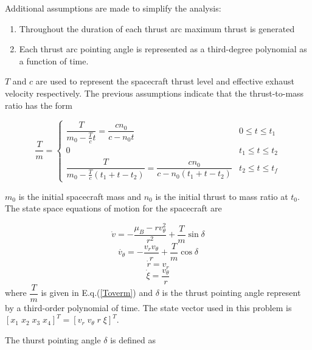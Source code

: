 \noindent Additional assumptions are made to simplify the analysis:

\begin{enumerate}
    \item Throughout the duration of each thrust arc maximum thrust is generated
    \item Each thrust arc pointing angle is represented as a third-degree polynomial as a function of time.
\end{enumerate}

$T$ and $c$ are used to represent the spacecraft thrust level and effective exhaust velocity respectively. The previous assumptions
indicate that the thrust-to-mass ratio has the form

\begin{equation}
\dfrac{T}{m} = \begin{cases} 
    \dfrac{T}{m_0-\frac{T}{c}t} = \dfrac{cn_0}{c-n_0t} & 0\leq t \leq t_1 \\
    0 & t_1\leq t \leq t_2 \\
    \dfrac{T}{m_0-\frac{T}{c}(t_1+t-t_2)} = \dfrac{cn_0}{c-n_0(t_1+t-t_2)} & t_2\leq t \leq t_f 
  \end{cases}
  \label{Toverm}
\end{equation}

\noindent $m_0$ is the initial spacecraft mass and $n_0$ is the initial thrust to mass ratio at $t_0$.
The state space equations of motion for the spacecraft are

\begin{equation}
    \dot{v} = -\dfrac{\mu_B-rv_\theta^2}{r^2}+\dfrac{T}{m}\sin\delta
    \label{vrdot_eom}
\end{equation}
\begin{equation}
\dot{v_\theta} = -\dfrac{v_rv_\theta}{r}+\dfrac{T}{m}\cos\delta
\label{vthetadot_eom}
\end{equation}
\begin{equation}
    \dot{r} = v_r
    \label{rdot_eom}
\end{equation}
\begin{equation}
    \label{xidot_eom}
\dot{\xi} = \dfrac{v_\theta}{r}
\end{equation}
where $\dfrac{T}{m}$ is given in E.q.(\ref{Toverm}) and $\delta$ is the thrust pointing angle represent by a
third-order polynomial of time. The state vector used in this problem is $[x_1 \; x_2 \; x_3 \; x_4]^T = [ v_r \; v_\theta \; r \; \xi ]^T$. \linebreak

\noindent The thurst pointing angle $\delta$ is defined as 

